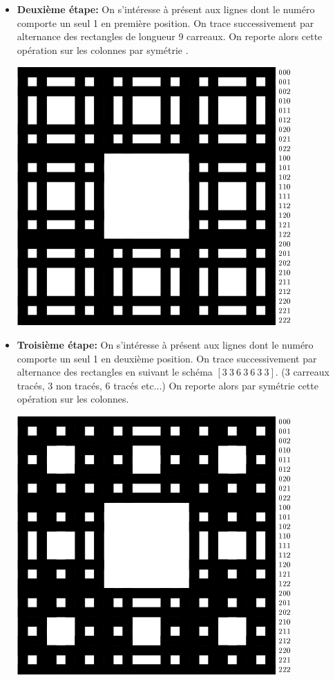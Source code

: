 \begin{itemize}
\item [\textbullet] \textbf{Deuxième étape:} On s'intéresse à présent aux lignes dont le numéro comporte un seul 1 en première position. On trace successivement par alternance des rectangles de longueur 9 carreaux. On reporte alors cette opération sur les colonnes par symétrie .\\
\begin{center}
\includegraphics{images/menger-schema04.png}
\end{center} 
\item [\textbullet] \textbf{Troisième étape:} On s'intéresse à présent aux lignes dont le numéro comporte un seul 1 en deuxième position. On trace successivement par alternance des rectangles en suivant le schéma $[3\ 3\ 6\ 3\ 6\ 3\ 3]$. (3 carreaux tracés, 3 non tracés, 6 tracés etc...) On reporte alors par symétrie cette opération sur les colonnes.
\begin{center}
\includegraphics{images/menger-schema05.png}

\end{center}
\end{itemize}
